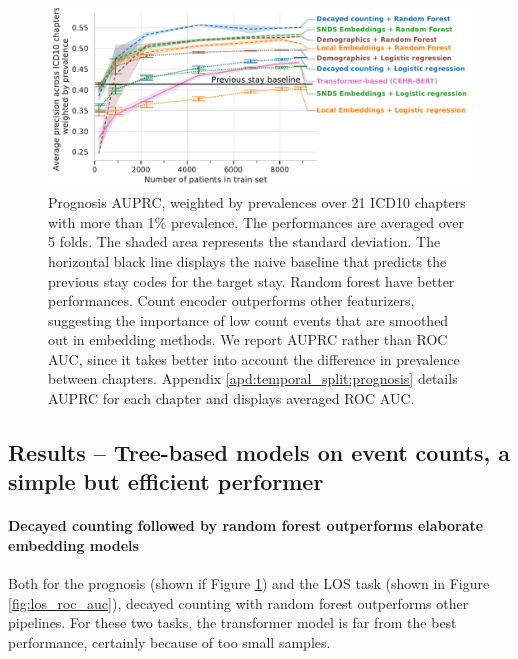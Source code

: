 \documentclass[french,12pt,twoside,a4paper]{book}
\begin{document}
\begin{figure}[!t]
  \centering
  \includegraphics[width=\linewidth]{img/chapter_3/prognosis/average_precision_score__c_weighted.pdf}
  \caption{Prognosis AUPRC, weighted by prevalences over 21
    ICD10 chapters with more than 1\% prevalence. The performances are averaged
    over 5 folds. The shaded area represents the standard deviation. The
    horizontal black line displays the naive baseline that predicts the previous
    stay codes for the target stay. Random forest have better performances.
    Count encoder outperforms other featurizers, suggesting the importance of
    low count events that are smoothed out in embedding methods. We report
    AUPRC rather than ROC AUC, since it takes better into account
    the difference in prevalence between chapters. Appendix
    \ref{apd:temporal_split:prognosis} details AUPRC for each
    chapter and displays averaged ROC AUC.}%
  \label{fig:prognosis_auprc}
\end{figure}

\subsection{Results -- Tree-based models on event counts, a simple but efficient
  performer}%
\label{subsec:predictive_models:results}

\paragraph{Decayed counting followed by random forest outperforms elaborate
  embedding models}%

Both for the prognosis (shown if Figure \ref{fig:prognosis_auprc}) and the
LOS task (shown in Figure \ref{fig:los_roc_auc}), decayed counting with random
forest outperforms other pipelines. For these two tasks, the transformer model
is far from the best performance, certainly because of too small samples.
\end{document}

